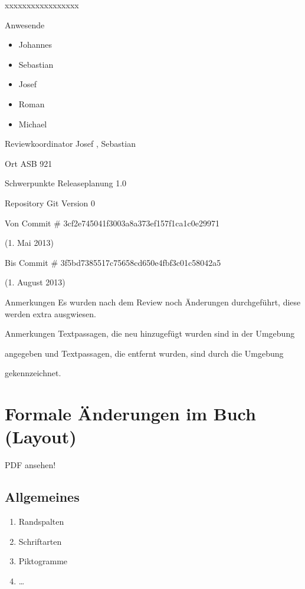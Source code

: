 \documentclass[
ngerman,
paper=a4,
asymmetric,
fontsize=10pt,
draft=false,
numbers=noenddot,
bibtotocnumbered,
footnotes=multiple,
]{scrreprt}
\newcommand{\jALT}{\vspace{6pt}\noindent{\color{red}\sffamily\textbf{DELETED}\hrulefill\newline}}
\newcommand{\jALTende}{\newline{\color{red}\rule{\linewidth}{2pt}\newline}}
\newcommand{\jNEU}{\vspace{6pt}\noindent{\color{green}\sffamily\textbf{ADDED}\hrulefill\newline}}
\newcommand{\jNEUende}{\newline{\color{green}\rule{\linewidth}{3pt}\newline}}
\begin{document}
\begin{labeling}[:]{xxxxxxxxxxxxxxxxx}
  \item[Anwesende] ~
  \begin{itemize}
    \item Johannes 
    \item Sebastian 
    \item Josef 
    \item Roman 
    \item Michael 
  \end{itemize}
  \item[Reviewkoordinator] Josef , Sebastian 
  \item[Ort] ASB 921
  \item[Schwerpunkte] Releaseplanung 1.0
  \item[Repository] Git Version 0
  \item[Von Commit \#] 3cf2e745041f3003a8a373ef157f1ca1c0e29971 
  
  (1. Mai 2013)
  \item[Bis Commit \#] 3f5bd7385517c75658cd650e4fbf3c01c58042a5 
  
  (1. August 2013)
  \item[Anmerkungen] Es wurden nach dem Review noch Änderungen durchgeführt, diese werden extra ausgwiesen.
  \item[Anmerkungen] Textpassagen, die neu hinzugefügt wurden sind in der
  Umgebung
  
  \jNEU
  \jNEUende
  
  angegeben und Textpassagen, die entfernt wurden, sind durch die Umgebung
  
  \jALT
  \jALTende
  
  gekennzeichnet.
  


\end{labeling}
\begin{WidePar}\small
\setcounter{tocdepth}{3}
\tableofcontents
\end{WidePar}

\chapter{Formale Änderungen im Buch (Layout)}
PDF ansehen!

\section{Allgemeines}
\begin{enumerate}
  \item Randspalten
  \item Schriftarten
  \item Piktogramme
  \item \ldots
\end{enumerate}
\end{document}
